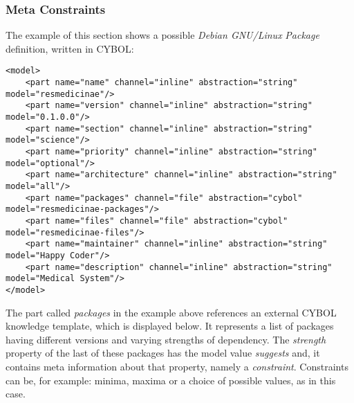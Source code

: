 %
%
%
%
%
%
%

\subsubsection{Meta Constraints}
\label{meta_constraints_heading}

The example of this section shows a possible \emph{Debian GNU/Linux}
\cite{debian} \emph{Package} definition, written in CYBOL:

\begin{scriptsize}
    \begin{verbatim}
<model>
    <part name="name" channel="inline" abstraction="string" model="resmedicinae"/>
    <part name="version" channel="inline" abstraction="string" model="0.1.0.0"/>
    <part name="section" channel="inline" abstraction="string" model="science"/>
    <part name="priority" channel="inline" abstraction="string" model="optional"/>
    <part name="architecture" channel="inline" abstraction="string" model="all"/>
    <part name="packages" channel="file" abstraction="cybol" model="resmedicinae-packages"/>
    <part name="files" channel="file" abstraction="cybol" model="resmedicinae-files"/>
    <part name="maintainer" channel="inline" abstraction="string" model="Happy Coder"/>
    <part name="description" channel="inline" abstraction="string" model="Medical System"/>
</model>
    \end{verbatim}
\end{scriptsize}

The part called \emph{packages} in the example above references an external
CYBOL knowledge template, which is displayed below. It represents a list of
packages having different versions and varying strengths of dependency. The
\emph{strength} property of the last of these packages has the model value
\emph{suggests} and, it contains meta information about that property, namely
a \emph{constraint}. Constraints can be, for example: minima, maxima or a
choice of possible values, as in this case.

